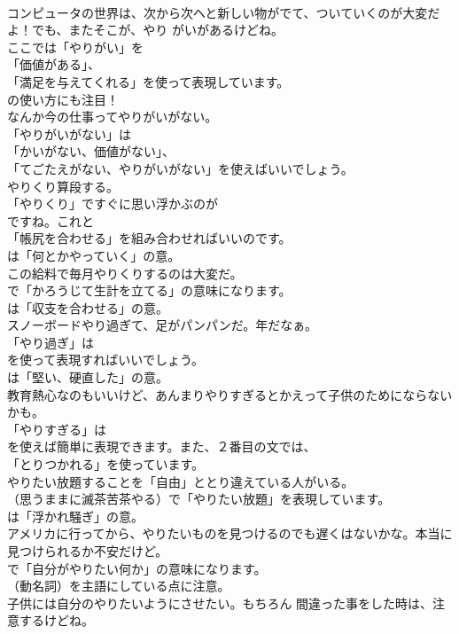 \documentclass[8pt]{extreport}
\begin{document}
\begin{CJK}{UTF8}{min}
\\	コンピュータの世界は、次から次へと新しい物がでて、ついていくのが大変だよ！でも、またそこが、やり がいがあるけどね。 
\\	ここでは「やりがい」を
\\	「価値がある」、
\\	「満足を与えてくれる」を使って表現しています。
\\	の使い方にも注目！	
\\	なんか今の仕事ってやりがいがない。 
\\	「やりがいがない」は
\\	「かいがない、価値がない」、
\\	「てごたえがない、やりがいがない」を使えばいいでしょう。	
\\	やりくり算段する。 
\\	「やりくり」ですぐに思い浮かぶのが
\\	ですね。これと
\\	「帳尻を合わせる」を組み合わせればいいのです。
\\	は「何とかやっていく」の意。	
\\	この給料で毎月やりくりするのは大変だ。 
\\	で「かろうじて生計を立てる」の意味になります。
\\	は「収支を合わせる」の意。	
\\	スノーボードやり過ぎて、足がパンパンだ。年だなぁ。 
\\	「やり過ぎ」は
\\	を使って表現すればいいでしょう。
\\	は「堅い、硬直した」の意。	
\\	教育熱心なのもいいけど、あんまりやりすぎるとかえって子供のためにならないかも。 
\\	「やりすぎる」は
\\	を使えば簡単に表現できます。また、２番目の文では、
\\	「とりつかれる」を使っています。	
\\	やりたい放題することを「自由」ととり違えている人がいる。 
\\	（思うままに滅茶苦茶やる）で「やりたい放題」を表現しています。
\\	は「浮かれ騒ぎ」の意。	
\\	アメリカに行ってから、やりたいものを見つけるのでも遅くはないかな。本当に見つけられるか不安だけど。 
\\	で「自分がやりたい何か」の意味になります。
\\	（動名詞）を主語にしている点に注意。	
\\	子供には自分のやりたいようにさせたい。もちろん 間違った事をした時は、注意するけどね。 

\end{CJK}
\end{document}
